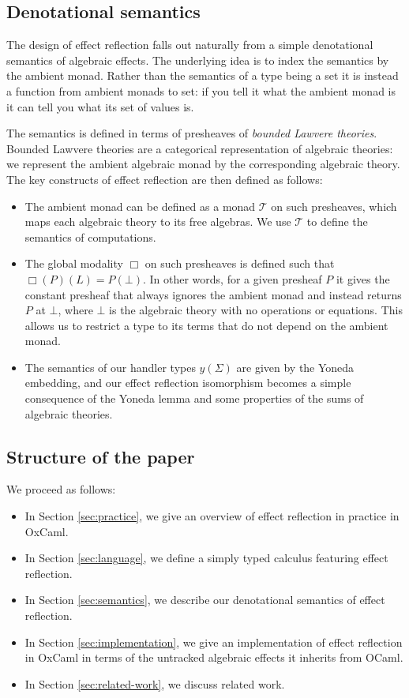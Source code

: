 \documentclass[acmsmall, screen, nonacm]{acmart}
\theoremstyle{definition}
\newcommand{\glob}{\mathop{\Box}}
\newcommand{\initial}{\bot}
\newcommand{\yoneda}[1]{y(#1)}
\newcommand{\mon}{\mathcal{T}}
\begin{document}
\subsection{Denotational semantics} The design of effect reflection falls
out naturally from a simple denotational semantics of algebraic
effects. The underlying idea is to index the semantics by the ambient
monad. Rather than the semantics of a type being a set it is instead a
function from ambient monads to set: if you tell it what the ambient
monad is it can tell you what its set of values is.

The semantics is defined in terms of presheaves of \emph{bounded Lawvere
  theories}. Bounded Lawvere theories are a categorical representation
of algebraic theories: we represent the ambient algebraic monad by the
corresponding algebraic theory. The key constructs of effect reflection
are then defined as follows:

\begin{itemize}
\item The ambient monad can be defined as a monad $\mon$ on such
  presheaves, which maps each algebraic theory to its free algebras. We use
  $\mon$ to define the semantics of computations.

\item The global modality $\glob$ on such presheaves is defined such
  that $\glob(P)(L) = P(\initial)$. In other words, for a given presheaf
  $P$ it gives the constant presheaf that always ignores the ambient
  monad and instead returns $P$ at $\initial$, where $\initial$ is the
  algebraic theory with no operations or equations. This allows us to
  restrict a type to its terms that do not depend on the ambient monad.

\item The semantics of our handler types $\yoneda{\Sigma}$ are given by
  the Yoneda embedding, and our effect reflection isomorphism becomes a
  simple consequence of the Yoneda lemma and some properties of the sums
  of algebraic theories.
\end{itemize}

\subsection{Structure of the paper} We proceed as follows:
\begin{itemize}
\item In Section \ref{sec:practice}, we give an overview of effect reflection in
  practice in OxCaml.
\item In Section \ref{sec:language}, we define a simply typed calculus featuring
  effect reflection.
\item In Section \ref{sec:semantics}, we describe our denotational
  semantics of effect reflection.
\item In Section \ref{sec:implementation}, we give an implementation of effect
  reflection in OxCaml in terms of the untracked algebraic effects it
  inherits from OCaml.
\item In Section \ref{sec:related-work}, we discuss related work.
\end{itemize}
\end{document}
